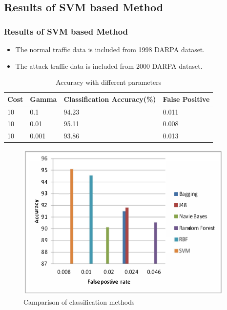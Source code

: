 \documentclass[10pt]{beamer}
\begin{document}
\begin{frame}
\section[]{Results of SVM based Method}
\frametitle{Results of SVM based Method}

\begin{itemize}
\footnotesize
\item
The normal traffic data is included from 1998 DARPA dataset.
\item

The attack traffic data is included from 2000 DARPA dataset.
\end{itemize}

\begin{table}
\scriptsize
\begin{center}
\begin{tabular}{ | m{2cm} | m{2cm}| m{2cm} | m{2cm} |} 
\hline
\textbf{Cost} & \textbf{Gamma} & \textbf{Classification Accuracy(\%)} & \textbf{False Positive} \\
\hline
10 &
0.1 &
94.23 &
0.011 \\
\hline
10 &
0.01 &
95.11 &
0.008 \\
\hline
10 &
0.001 &
93.86 &
0.013 \\
\hline
\end{tabular}
\end{center}
\caption{\footnotesize Accuracy with different parameters}
\end{table}

\begin{figure}[h]
\includegraphics[scale=0.35]{svm.png}
\caption{Camparison of classification methods	}

\end{figure}
\end{frame}
\end{document}
